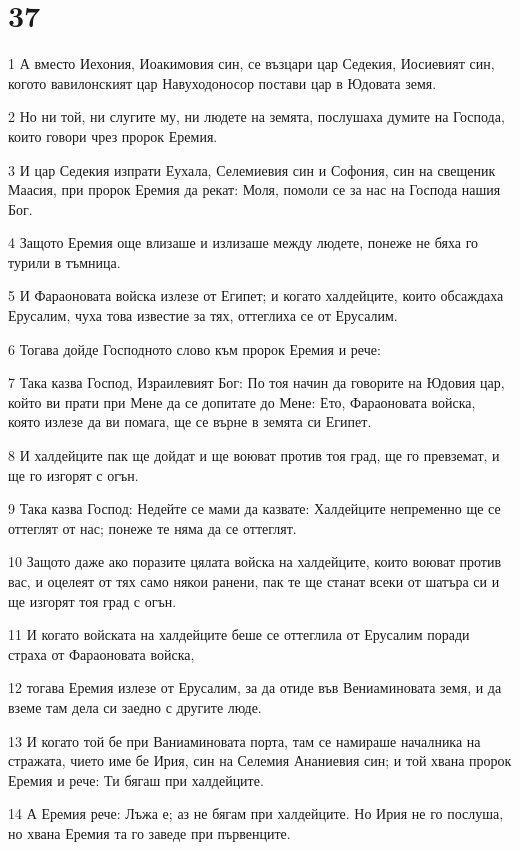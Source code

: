\chapter{37}

\par 1 А вместо Иехония, Иоакимовия син, се възцари цар Седекия, Иосиевият син, когото вавилонският цар Навуходоносор постави цар в Юдовата земя.
\par 2 Но ни той, ни слугите му, ни людете на земята, послушаха думите на Господа, които говори чрез пророк Еремия.
\par 3 И цар Седекия изпрати Еухала, Селемиевия син и Софония, син на свещеник Маасия, при пророк Еремия да рекат: Моля, помоли се за нас на Господа нашия Бог.
\par 4 Защото Еремия още влизаше и излизаше между людете, понеже не бяха го турили в тъмница.
\par 5 И Фараоновата войска излезе от Египет; и когато халдейците, които обсаждаха Ерусалим, чуха това известие за тях, оттеглиха се от Ерусалим.
\par 6 Тогава дойде Господното слово към пророк Еремия и рече:
\par 7 Така казва Господ, Израилевият Бог: По тоя начин да говорите на Юдовия цар, който ви прати при Мене да се допитате до Мене: Ето, Фараоновата войска, която излезе да ви помага, ще се върне в земята си Египет.
\par 8 И халдейците пак ще дойдат и ще воюват против тоя град, ще го превземат, и ще го изгорят с огън.
\par 9 Така казва Господ: Недейте се мами да казвате: Халдейците непременно ще се оттеглят от нас; понеже те няма да се оттеглят.
\par 10 Защото даже ако поразите цялата войска на халдейците, които воюват против вас, и оцелеят от тях само някои ранени, пак те ще станат всеки от шатъра си и ще изгорят тоя град с огън.
\par 11 И когато войската на халдейците беше се оттеглила от Ерусалим поради страха от Фараоновата войска,
\par 12 тогава Еремия излезе от Ерусалим, за да отиде във Вениаминовата земя, и да вземе там дела си заедно с другите люде.
\par 13 И когато той бе при Ваниаминовата порта, там се намираше началника на стражата, чието име бе Ирия, син на Селемия Ананиевия син; и той хвана пророк Еремия и рече: Ти бягаш при халдейците.
\par 14 А Еремия рече: Лъжа е; аз не бягам при халдейците. Но Ирия не го послуша, но хвана Еремия та го заведе при първенците.
